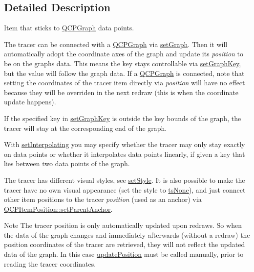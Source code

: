 \subsection{Detailed Description}
Item that sticks to \mbox{\hyperlink{class_q_c_p_graph}{Q\+C\+P\+Graph}} data points. 

 The tracer can be connected with a \mbox{\hyperlink{class_q_c_p_graph}{Q\+C\+P\+Graph}} via \mbox{\hyperlink{class_q_c_p_item_tracer_af5886f4ded8dd68cb4f3388f390790c0}{set\+Graph}}. Then it will automatically adopt the coordinate axes of the graph and update its {\itshape position} to be on the graph\textquotesingle{}s data. This means the key stays controllable via \mbox{\hyperlink{class_q_c_p_item_tracer_a6840143b42f3b685cedf7c6d83a704c8}{set\+Graph\+Key}}, but the value will follow the graph data. If a \mbox{\hyperlink{class_q_c_p_graph}{Q\+C\+P\+Graph}} is connected, note that setting the coordinates of the tracer item directly via {\itshape position} will have no effect because they will be overriden in the next redraw (this is when the coordinate update happens).

If the specified key in \mbox{\hyperlink{class_q_c_p_item_tracer_a6840143b42f3b685cedf7c6d83a704c8}{set\+Graph\+Key}} is outside the key bounds of the graph, the tracer will stay at the corresponding end of the graph.

With \mbox{\hyperlink{class_q_c_p_item_tracer_a6c244a9d1175bef12b50afafd4f5fcd2}{set\+Interpolating}} you may specify whether the tracer may only stay exactly on data points or whether it interpolates data points linearly, if given a key that lies between two data points of the graph.

The tracer has different visual styles, see \mbox{\hyperlink{class_q_c_p_item_tracer_a41a2ac4f1acd7897b4e2a2579c03204e}{set\+Style}}. It is also possible to make the tracer have no own visual appearance (set the style to \mbox{\hyperlink{class_q_c_p_item_tracer_a2f05ddb13978036f902ca3ab47076500aac27462c79146225bfa8fba24d2ee8a4}{ts\+None}}), and just connect other item positions to the tracer {\itshape position} (used as an anchor) via \mbox{\hyperlink{class_q_c_p_item_position_ac094d67a95d2dceafa0d50b9db3a7e51}{Q\+C\+P\+Item\+Position\+::set\+Parent\+Anchor}}.

\begin{DoxyNote}{Note}
The tracer position is only automatically updated upon redraws. So when the data of the graph changes and immediately afterwards (without a redraw) the position coordinates of the tracer are retrieved, they will not reflect the updated data of the graph. In this case \mbox{\hyperlink{class_q_c_p_item_tracer_a5b90296109e36384aedbc8908a670413}{update\+Position}} must be called manually, prior to reading the tracer coordinates. 
\end{DoxyNote}



